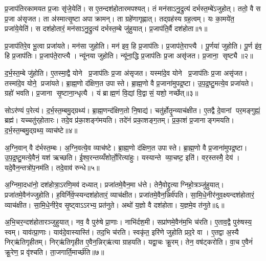 \clearpage
{}
\setcounter{anuvakam}{0}
प्र॒जाप॑तिरकामयत प्र॒जाः सृ॑जे॒येति॑। स ए॒तन्दश॑होतारमपश्यत्। तं मन॑साऽनु॒द्रुत्य॑ दर्भस्त॒म्बे॑ऽजुहोत्। ततो॒ वै स प्र॒जा अ॑सृजत। ता अ॑स्मात्सृ॒ष्टा अपाक्रामन्। ता ग्रहे॑णागृह्णात्। तद्ग्रह॑स्य ग्रह॒त्वम्। यः का॒मये॑त॒ प्रजा॑ये॒येति॑। स दश॑होतारं॒ मन॑साऽनु॒द्रुत्य॑ दर्भस्त॒म्बे जु॑हुयात्। प्र॒जाप॑ति॒र्वै दश॑होता॥१॥

प्र॒जाप॑तिरे॒व भू॒त्वा प्रजा॑यते। मन॑सा जुहोति। मन॑ इव॒ हि प्र॒जाप॑तिः। प्र॒जाप॑ते॒राप्त्यै। पू॒र्णया॑ जुहोति। पू॒र्ण इ॑व॒ हि प्र॒जाप॑तिः। प्र॒जाप॑ते॒राप्त्यै। न्यू॑नया जुहोति। न्यू॑ना॒द्धि प्र॒जाप॑तिः प्र॒जा असृ॑जत। प्र॒जाना॒ सृष्ट्यै॥२॥

द॒र्भ॒स्त॒म्बे जु॑होति। ए॒तस्मा॒द्वै योने प्र॒जाप॑तिः प्र॒जा अ॑सृजत। यस्मा॑दे॒व योने प्र॒जाप॑तिः प्र॒जा असृ॑जत। तस्मा॑दे॒व योने॒ प्रजा॑यते। ब्रा॒ह्म॒णो द॑क्षिण॒त उपास्ते। ब्रा॒ह्म॒णो वै प्र॒जाना॑मुपद्र॒ष्टा। उ॒प॒द्र॒ष्टु॒मत्ये॒व प्रजा॑यते। ग्रहो॑ भवति। प्र॒जाना सृ॒ष्टाना॒न्धृत्यै। यं ब्राह्म॒णं वि॒द्यां वि॒द्वासं॒ यशो॒ नर्च्छेत्॥३॥

सोऽर॑ण्यं प॒रेत्य॑। द॒र्भ॒स्त॒म्बमु॒द्ग्रथ्य॑। ब्रा॒ह्म॒णन्द॑क्षिण॒तो नि॒षाद्य॑। चतु॑र्होतॄ॒न्व्याच॑क्षीत। ए॒तद्वै दे॒वानां पर॒मङ्गुह्यं॒ ब्रह्म॑। यच्चतु॑र्‌होतारः। तदे॒व प्र॑का॒शङ्ग॑मयति। तदे॑नं प्रका॒शङ्ग॒तम्। प्र॒का॒शं प्र॒जानाङ्गमयति। द॒र्भ॒स्त॒म्बमु॒द्ग्रथ्य॒ व्याच॑ष्टे॥४॥

अ॒ग्नि॒वान् वै द॑र्भस्त॒म्बः। अ॒ग्नि॒वत्ये॒व व्याच॑ष्टे। ब्रा॒ह्म॒णो द॑क्षिण॒त उपास्ते। ब्रा॒ह्म॒णो वै प्र॒जाना॑मुपद्र॒ष्टा। उ॒प॒द्र॒ष्टु॒मत्ये॒वैनं॒ यश॑ ऋच्छति। ई॒श्व॒रन्तय्यँशोर्तो॒रित्या॑हुः। यस्यान्ते व्या॒चष्ट॒ इति॑। वर॒स्तस्मै॒ देय॑। यदे॒वैन॒न्तत्रो॑प॒नम॑ति। तदे॒वाव॑ रुन्धे॥५॥

अ॒ग्निमा॒दधा॑नो॒ दश॑होत्रा॒ऽरणि॒मव॑ दध्यात्। प्रजा॑तमे॒वैन॒मा ध॑त्ते। तेनै॒वोद्द्रुत्याग्निहो॒त्रञ्जु॑हुयात्। प्रजा॑तमे॒वैन॑ज्जुहोति। ह॒विर्नि॑र्व॒प्स्यन्दश॑होतारं॒ व्याच॑क्षीत। प्रजा॑तमे॒वैन॒न्निर्व॑पति। सा॒मि॒धे॒नीर॑नुव॒क्ष्यन्दश॑होतारं॒ व्याच॑क्षीत। सा॒मि॒धे॒नीरे॒व सृ॒ष्ट्वाऽऽरभ्य॒ प्रत॑नुते। अथो॑ य॒ज्ञो वै दश॑होता। य॒ज्ञमे॒व त॑नुते॥६॥

अ॒भि॒चर॒न्दश॑होतारञ्जुहुयात्। नव॒ वै पुरु॑षे प्रा॒णाः। नाभि॑र्दश॒मी। सप्रा॑णमे॒वैन॑म॒भि च॑रति। ए॒ताव॒द्वै पुरु॑षस्य॒ स्वम्। याव॑त्प्रा॒णाः। याव॑दे॒वास्यास्ति॑। तद॒भि च॑रति। स्वकृ॑त॒ इरि॑णे जुहोति प्रद॒रे वा। ए॒तद्वा अ॒स्यै निर्‌ऋ॑तिगृहीतम्। निर्‌ऋ॑तिगृहीत ए॒वैन॒न्निर्‌ऋ॑त्या ग्राहयति। यद्वा॒चः क्रू॒रम्। तेन॒ वष॑ट्करोति। वा॒च ए॒वैनं॑ क्रू॒रेण॒ प्र वृ॑श्चति। ता॒जगार्ति॒मार्च्छ॑ति॥७॥\anuvakamend[दश॑होता॒ सृष्ट्या॑ ऋ॒च्छेद्व्याच॑प्टे रुन्ध ए॒व त॑नुते॒ निर्‌ऋ॑तिगृहीतं॒ पञ्च॑ च]

